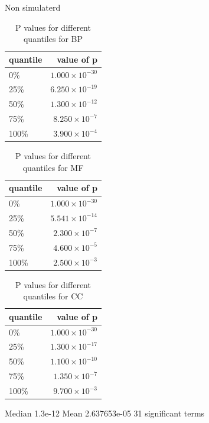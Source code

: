 Non simulaterd
\begin{table}[ht]
\centering
\begin{tabular}{lr}
  \hline
quantile & value of p \\ 
  \hline
0\% & $1.000 \times 10^{-30}$ \\ 
  25\% & $6.250 \times 10^{-19}$ \\ 
  50\% & $1.300 \times 10^{-12}$ \\ 
  75\% & $8.250 \times 10^{-7}$ \\ 
  100\% & $3.900 \times 10^{-4}$ \\ 
   \hline
\end{tabular}
\caption{P values for different quantiles for BP} 
\label{tabP values for different quantiles for BP}
\end{table}

\begin{table}[ht]
\centering
\begin{tabular}{lr}
  \hline
quantile & value of p \\ 
  \hline
0\% & $1.000 \times 10^{-30}$ \\ 
  25\% & $5.541 \times 10^{-14}$ \\ 
  50\% & $2.300 \times 10^{-7}$ \\ 
  75\% & $4.600 \times 10^{-5}$ \\ 
  100\% & $2.500 \times 10^{-3}$ \\ 
   \hline
\end{tabular}
\caption{P values for different quantiles for MF} 
\label{tabP values for different quantiles for MF}
\end{table}

\begin{table}[ht]
\centering
\begin{tabular}{lr}
  \hline
quantile & value of p \\ 
  \hline
0\% & $1.000 \times 10^{-30}$ \\ 
  25\% & $1.300 \times 10^{-17}$ \\ 
  50\% & $1.100 \times 10^{-10}$ \\ 
  75\% & $1.350 \times 10^{-7}$ \\ 
  100\% & $9.700 \times 10^{-3}$ \\ 
   \hline
\end{tabular}
\caption{P values for different quantiles for CC} 
\label{tabP values for different quantiles for CC}
\end{table}
Median 1.3e-12
Mean 2.637653e-05
31 significant terms


